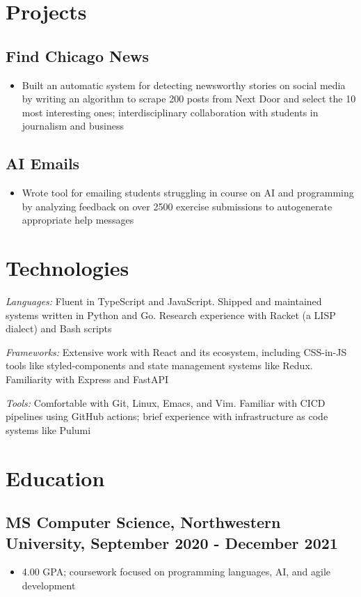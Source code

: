 \documentclass[letterpaper]{article}
\begin{document}
\section*{Projects}
\subsection*{Find Chicago News}
\begin{itemize}
  \item Built an automatic system for detecting newsworthy stories on social media by writing an algorithm to scrape 200 posts from Next Door and select the 10 most interesting ones; interdisciplinary collaboration with students in journalism and business
\end{itemize}
\subsection*{AI Emails}
\begin{itemize}
  \item Wrote tool for emailing students struggling in course on AI and programming by analyzing feedback on over 2500 exercise submissions to autogenerate appropriate help messages
\end{itemize}

\section*{Technologies}
\emph{Languages:} Fluent in TypeScript and JavaScript. 
Shipped and maintained systems written in Python and Go. 
Research experience with Racket (a LISP dialect) and Bash scripts

\emph{Frameworks:} Extensive work with React and its ecosystem, including CSS-in-JS tools like styled-components and state management systems like Redux. Familiarity with Express and FastAPI

\emph{Tools:} Comfortable with Git, Linux, Emacs, and Vim. Familiar with CICD pipelines using GitHub actions; brief experience with infrastructure as code systems like Pulumi
\section*{Education}

\subsection*{MS Computer Science, Northwestern University, September 2020 - December 2021}
\begin{itemize}
\item 4.00 GPA; coursework focused on programming languages, AI, and agile development
\end{itemize}
\end{document}
